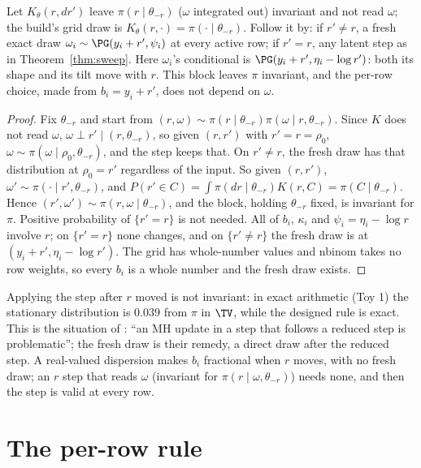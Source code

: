 \begin{theorem}\label{thm:nb}
Let $K_\theta(r,dr')$ leave $\pi(r\mid\theta_{-r})$ ($\omega$ integrated out) invariant and not read $\omega$; the
build's grid draw is $K_\theta(r,\cdot)=\pi(\cdot\mid\theta_{-r})$. Follow it by: if $r'\ne r$, a fresh exact draw
$\omega_i\sim\PG(y_i+r',\psi_i)$ at every active row; if $r'=r$, any latent step as in Theorem~\ref{thm:sweep}.
Here $\omega_i$'s conditional is $\PG(y_i+r',\eta_i-\log r')$: both its shape and its tilt move with $r$. This
block leaves $\pi$ invariant, and the per-row choice, made from $b_i=y_i+r'$, does not depend on $\omega$.
\end{theorem}
\begin{proof}
Fix $\theta_{-r}$ and start from $(r,\omega)\sim\pi(r\mid\theta_{-r})\pi(\omega\mid r,\theta_{-r})$. Since
$K$ does not read $\omega$, $\omega\perp r'\mid(r,\theta_{-r})$, so given $(r,r')$ with $r'=r=\rho_0$, $\omega\sim
\pi(\omega\mid\rho_0,\theta_{-r})$, and the step keeps that. On $r'\ne r$, the fresh draw has that distribution
at $\rho_0=r'$ regardless of the input. So given $(r,r')$, $\omega'\sim\pi(\cdot\mid r',\theta_{-r})$, and
$P(r'\in C)=\int\pi(dr\mid\theta_{-r})K(r,C)=\pi(C\mid\theta_{-r})$. Hence $(r',\omega')\sim\pi(r,\omega\mid
\theta_{-r})$, and the block, holding $\theta_{-r}$ fixed, is invariant for $\pi$. Positive probability of
$\{r'=r\}$ is not needed. All of $b_i$, $\kappa_i$ and $\psi_i=\eta_i-\log r$ involve $r$; on
$\{r'=r\}$ none changes, and on $\{r'\ne r\}$ the fresh draw is at $(y_i+r',\eta_i-\log r')$. The grid has whole-number values and nbinom takes no row weights, so every $b_i$ is a whole number and the
fresh draw exists.
\end{proof}

Applying the step after $r$ moved is not invariant: in exact arithmetic (Toy 1) the stationary distribution is
$0.039$ from $\pi$ in $\TV$, while the designed rule is exact. This is the situation of \cite[Sec.~3, Sampler
Fragment 1 and the remark after it]{vdj}: ``an MH update in a step that follows a reduced step is
problematic''; the fresh draw is their remedy, a direct draw after the reduced step. A real-valued dispersion
makes $b_i$ fractional when $r$ moves, with no fresh draw; an $r$ step that reads $\omega$ (invariant for
$\pi(r\mid\omega,\theta_{-r})$) needs none, and then the step is valid at every row.

\section{The per-row rule}\label{sec:rule}

